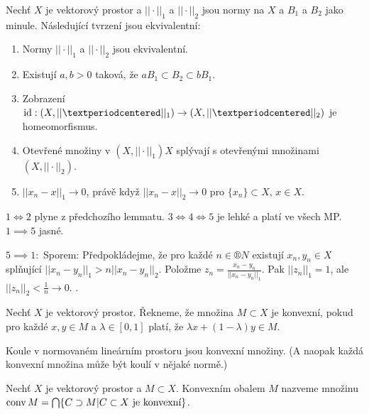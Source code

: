 \documentclass[12pt]{article}					%
\begin{document}
\begin{tvrzeni}
	Nechť $X$ je vektorový prostor a $||·||_1$ a $||·||_2$ jsou normy na $X$ a $B_1$ a $B_2$ jako minule. Následující tvrzení jsou ekvivalentní:
	\begin{enumerate}
		\item Normy $||·||_1$ a $||·||_2$ jsou ekvivalentní.
		\item Existují $a, b > 0$ taková, že $aB_1 \subset B_2 \subset bB_1$.
		\item Zobrazení $\id: (X, ||·||_1) \rightarrow \left(X, ||·||_2\right)$ je homeomorfismus.
		\item Otevřené množiny v $\left(X, ||·||_1\right)X$ splývají s otevřenými množinami $\left(X, ||·||_2\right)$.
		\item $||x_n - x||_1 \rightarrow 0$, právě když $||x_n - x||_2 \rightarrow 0$ pro $\{x_n\} \subset X$, $x \in X$.
	\end{enumerate}

	\begin{dukazin}
		$1 \Leftrightarrow 2$ plyne z předchozího lemmatu. $3 \Leftrightarrow 4 \Leftrightarrow 5$ je lehké a platí ve všech MP. $1 \implies 5$ jasné.

		$5 \implies 1:$ Sporem: Předpokládejme, že pro každé $n \in ®N$ existují $x_n, y_n \in X$ splňující $||x_n - y_n||_1 > n ||x_n - y_n||_2$. Položme $z_n = \frac{x_n - y_n}{||x_n - y_n||_1}$. Pak $||z_n||_1 = 1$, ale $||z_n||_2 < \frac{1}{n} \rightarrow 0$. \lightning.
	\end{dukazin}
\end{tvrzeni}

\begin{definice}
	Nechť $X$ je vektorový prostor. Řekneme, že množina $M \subset X$ je konvexní, pokud pro každé $x, y \in M$ a $\lambda \in [0, 1]$ platí, že $\lambda x + (1-\lambda)y \in M$.
\end{definice}

\begin{poznamka}[Fakt]
	Koule v normovaném lineárním prostoru jsou konvexní množiny. (A naopak každá konvexní množina může být koulí v nějaké normě.)
\end{poznamka}

\begin{definice}
	Nechť $X$ je vektorový prostor a $M \subset X$. Konvexním obalem $M$ nazveme množinu $\operatorname{conv} M = \bigcap \{C \supset M | C \subset X \text{ je konvexní}\}$.
\end{definice}
\end{document}
